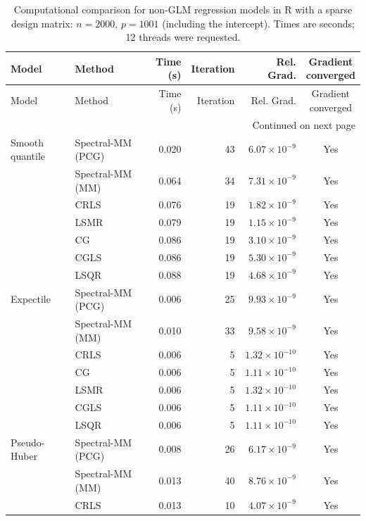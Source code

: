 \documentclass[10pt,a4paper]{article}
\begin{document}
\clearpage
\begingroup
\small
\setlength{\tabcolsep}{4pt}
\begin{longtable}{llrrrc}
\caption{Computational comparison for non-GLM regression models in R with a sparse design matrix: $n=2000$, $p=1001$ (including the intercept). Times are seconds; 12 threads were requested.}
\label{tab:R-sparse-nonglm-initial}\\
\toprule
Model & Method & Time (s) & Iteration & Rel. Grad. & \shortstack{Gradient\\converged} \\
\midrule
\endfirsthead
\toprule
Model & Method & Time (s) & Iteration & Rel. Grad. & \shortstack{Gradient\\converged} \\
\midrule
\endhead
\midrule
\multicolumn{6}{r}{Continued on next page}\\
\endfoot
\bottomrule
\endlastfoot
Smooth quantile & Spectral-MM (PCG) & 0.020 & 43 & $6.07\times10^{-9}$ & Yes \\
 & Spectral-MM (MM) & 0.064 & 34 & $7.31\times10^{-9}$ & Yes \\
 & CRLS & 0.076 & 19 & $1.82\times10^{-9}$ & Yes \\
 & LSMR & 0.079 & 19 & $1.15\times10^{-9}$ & Yes \\
 & CG & 0.086 & 19 & $3.10\times10^{-9}$ & Yes \\
 & CGLS & 0.086 & 19 & $5.30\times10^{-9}$ & Yes \\
 & LSQR & 0.088 & 19 & $4.68\times10^{-9}$ & Yes \\
\midrule
Expectile & Spectral-MM (PCG) & 0.006 & 25 & $9.93\times10^{-9}$ & Yes \\
 & Spectral-MM (MM) & 0.010 & 33 & $9.58\times10^{-9}$ & Yes \\
 & CRLS & 0.006 & 5 & $1.32\times10^{-10}$ & Yes \\
 & CG & 0.006 & 5 & $1.11\times10^{-10}$ & Yes \\
 & LSMR & 0.006 & 5 & $1.32\times10^{-10}$ & Yes \\
 & CGLS & 0.006 & 5 & $1.11\times10^{-10}$ & Yes \\
 & LSQR & 0.006 & 5 & $1.11\times10^{-10}$ & Yes \\
\midrule
Pseudo-Huber & Spectral-MM (PCG) & 0.008 & 26 & $6.17\times10^{-9}$ & Yes \\
 & Spectral-MM (MM) & 0.013 & 40 & $8.76\times10^{-9}$ & Yes \\
 & CRLS & 0.013 & 10 & $4.07\times10^{-9}$ & Yes \\

\end{longtable}
\end{document}
